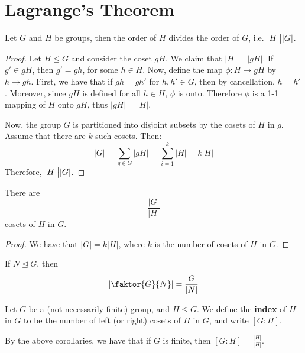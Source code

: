 \section{Lagrange's Theorem}
\label{section_3.3}

\begin{theorem}\label{theorem_3.3.1}
  Let $G$ and  $H$ be groups, then the order of $H$ divides the order
  of $G$, i.e. $|H| \big{|} |G|$.
\end{theorem}
\begin{proof}
  Let $H \leq G$ and consider the coset $gH$. We claim that  $|H|=|gH|$.
  If $g' \in gH$, then  $g'=gh$, for some  $h \in H$. Now, define the map
  $\phi:H \rightarrow gH$ by $h \rightarrow gh$. First, we have that  if
  $gh=gh'$ for  $h,h' \in G$, then by cancellation, $h=h'$. Moreover, since
  $gH$ is defined for all  $h \in H$,  $\phi$ is onto. Therefore  $\phi$ is a
  1-1 mapping of  $H$ onto  $gH$, thus  $|gH|=|H|$.

  Now, the group $G$ is partitioned into disjoint subsets by the cosets of
  $H$ in  $g$. Assume that there are $k$ such cosets. Then:
  \begin{equation*}
    |G|=\sum_{g \in G}{|gH|}=\sum_{i=1}^k{|H|}=k|H|
  \end{equation*}
  Therefore, $|H| \big{|} |G|$.
\end{proof}
\begin{corollary}
  There are
  \begin{equation*}
    \frac{|G|}{|H|}
  \end{equation*}
  cosets of $H$ in  $G$.
\end{corollary}
\begin{proof}
  We have that $|G|=k|H|$, where  $k$ is the number of cosets of  $H$
  in  $G$.
\end{proof}
\begin{corollary}
  If $N \unlhd G$, then
  \begin{equation}
    |\faktor{G}{N}|=\frac{|G|}{|N|}
  \end{equation}
\end{corollary}

\begin{definition}
  Let $G$ be a (not necessarily finite) group, and  $H \leq G$. We define the
  \textbf{index} of $H$ in $G$ to be the number of left (or right) cosets of
  $H$ in $G$, and write $[G:H]$.
\end{definition}
\begin{remark}
  By the above corollaries, we have that if $G$ is finite, then
  $[G : H]=\frac{|H|}{|H|}$.
\end{remark}

